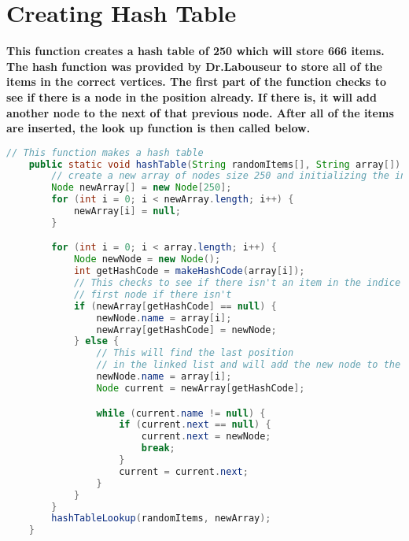 \documentclass{article}
\begin{document}
\section{Creating Hash Table}
\textbf{This function creates a hash table of 250 which will store 666 items. The hash function was provided by Dr.Labouseur to store all of the items in the correct vertices. The first part of the function checks to see if there is a node in the position already. If there is, it will add another node to the next of that previous node. After all of the items are inserted, the look up function is then called below.}
\begin{lstlisting}[language = java]
// This function makes a hash table
    public static void hashTable(String randomItems[], String array[]) {
        // create a new array of nodes size 250 and initializing the indices to null
        Node newArray[] = new Node[250];
        for (int i = 0; i < newArray.length; i++) {
            newArray[i] = null;
        }

        for (int i = 0; i < array.length; i++) {
            Node newNode = new Node();
            int getHashCode = makeHashCode(array[i]);
            // This checks to see if there isn't an item in the indice and then adds the
            // first node if there isn't
            if (newArray[getHashCode] == null) {
                newNode.name = array[i];
                newArray[getHashCode] = newNode;
            } else {
                // This will find the last position
                // in the linked list and will add the new node to the end.
                newNode.name = array[i];
                Node current = newArray[getHashCode];

                while (current.name != null) {
                    if (current.next == null) {
                        current.next = newNode;
                        break;
                    }
                    current = current.next;
                }
            }
        }
        hashTableLookup(randomItems, newArray);
    }

    
\end{lstlisting}
\end{document}

